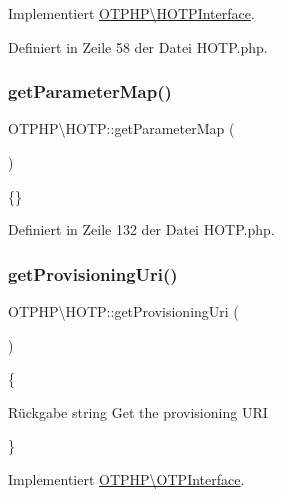 Implementiert \mbox{\hyperlink{interface_o_t_p_h_p_1_1_h_o_t_p_interface_afbd9f89ad37a387a954dbe134e3807ff}{O\+T\+P\+H\+P\textbackslash{}\+H\+O\+T\+P\+Interface}}.



Definiert in Zeile 58 der Datei H\+O\+T\+P.\+php.

\mbox{\label{class_o_t_p_h_p_1_1_h_o_t_p_abbff46cff0f5e15fe70a1b25065aa1e6}} 
\subsubsection{\texorpdfstring{get\+Parameter\+Map()}{getParameterMap()}}
{\footnotesize\ttfamily O\+T\+P\+H\+P\textbackslash{}\+H\+O\+T\+P\+::get\+Parameter\+Map (\begin{DoxyParamCaption}{ }\end{DoxyParamCaption})\hspace{0.3cm}{\ttfamily [protected]}}

\{\} 

Definiert in Zeile 132 der Datei H\+O\+T\+P.\+php.

\mbox{\label{class_o_t_p_h_p_1_1_h_o_t_p_a468b545132d70bd82e48806243bd2269}} 
\subsubsection{\texorpdfstring{get\+Provisioning\+Uri()}{getProvisioningUri()}}
{\footnotesize\ttfamily O\+T\+P\+H\+P\textbackslash{}\+H\+O\+T\+P\+::get\+Provisioning\+Uri (\begin{DoxyParamCaption}{ }\end{DoxyParamCaption})}

\{\begin{DoxyReturn}{Rückgabe}
string Get the provisioning U\+RI
\end{DoxyReturn}
\} 

Implementiert \mbox{\hyperlink{interface_o_t_p_h_p_1_1_o_t_p_interface_a6e8f0a0c2f1c3ec16426a80fc9610089}{O\+T\+P\+H\+P\textbackslash{}\+O\+T\+P\+Interface}}.



